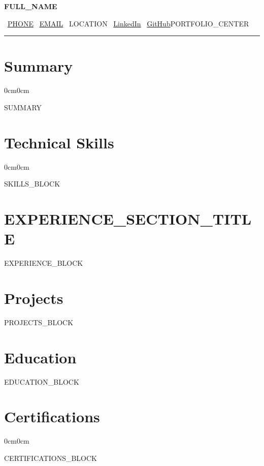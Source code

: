 \documentclass[10pt, letterpaper]{article}
\newenvironment{onecolentry}{
  \begin{adjustwidth}{0cm}{0cm}
}{\end{adjustwidth}}
\newenvironment{highlightsforbulletentries}{
  \begin{itemize}
}{\end{itemize}}
\let\hrefWithoutArrow\href
\begin{document}
{\LARGE\bfseries\color{namecolor} {{FULL_NAME}}}

\vspace{3pt}

\small
\faPhone\ \hrefWithoutArrow{tel:{{PHONE_RAW}}}{{{PHONE}}} \quad
\faEnvelope\ \hrefWithoutArrow{mailto:{{EMAIL}}}{{{EMAIL}}} \quad
\faMapMarker*\ {{LOCATION}} \quad
\faLinkedin\ \hrefWithoutArrow{{{LINKEDIN_URL}}}{LinkedIn} \quad
\faGithub\ \hrefWithoutArrow{{{GITHUB_URL}}}{GitHub}{{PORTFOLIO_CENTER}}

\vspace{2pt}
\noindent\rule{\linewidth}{0.4pt}

\section{Summary}
\begin{onecolentry}
{{SUMMARY}}
\end{onecolentry}

\section{Technical Skills}
\begin{onecolentry}
{{SKILLS_BLOCK}}
\end{onecolentry}

\section{{{EXPERIENCE_SECTION_TITLE}}}
{{EXPERIENCE_BLOCK}}

\section{Projects}
{{PROJECTS_BLOCK}}

\section{Education}
{{EDUCATION_BLOCK}}

\section{Certifications}
\begin{onecolentry}
  \begin{highlightsforbulletentries}
{{CERTIFICATIONS_BLOCK}}
  \end{highlightsforbulletentries}
\end{onecolentry}
\end{document}
